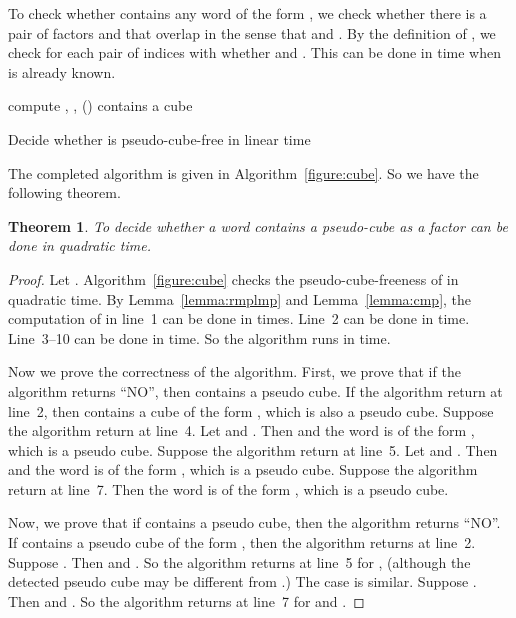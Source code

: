 \documentclass[12pt]{article}
\newtheorem{theorem}{Theorem}
\begin{document}
To check whether  contains any word of the form , we
check whether there is a pair of factors
 and  that
overlap in the sense that  and .
By the definition of , we check for each pair of indices
 with  whether  and .
This can be done in  time when  is already known.


\begin{algorithm}
  \SetLine {}
  \linesnumbered
  compute , , \;
  \lIf(){ contains a cube}{}
  \;
  \caption{Decide whether  is pseudo-cube-free in linear time}
  \label{figure:cube}
\end{algorithm}
The completed algorithm is given in Algorithm~\ref{figure:cube}. So
we have the following theorem.
\begin{theorem}
To decide whether a word  contains a pseudo-cube as a factor can
be done in quadratic time.
\end{theorem}
\begin{proof}
Let . Algorithm~\ref{figure:cube} checks the
pseudo-cube-freeness of  in quadratic time. By
Lemma~\ref{lemma:rmplmp} and Lemma~\ref{lemma:cmp}, the computation
of  in line~1 can be done in  times.
Line~2 can be done in  time. Line~3--10 can be done in
 time. So the algorithm runs in  time.

Now we prove the correctness of the algorithm. First, we prove that
if the algorithm returns ``NO'', then  contains a pseudo cube. If
the algorithm return at line~2, then  contains a cube of the form
, which is also a pseudo cube. Suppose the algorithm return at
line~4. Let  and . Then  and the
word  is of the form , which is a
pseudo cube. Suppose the algorithm return at line~5. Let
 and . Then  and the word
 is of the form , which is a pseudo
cube. Suppose the algorithm return at line~7. Then the word
 is of the form , which is a pseudo
cube.

Now, we prove that if  contains a pseudo cube, then the algorithm
returns ``NO''. If  contains a pseudo cube of the form ,
then the algorithm returns at line~2. Suppose
. Then  and
. So the algorithm returns at line~5
for , (although the detected pseudo cube
 may be different from
.) The case  is
similar. Suppose . Then
 and . So the
algorithm returns at line~7 for  and .
\end{proof}
\end{document}
